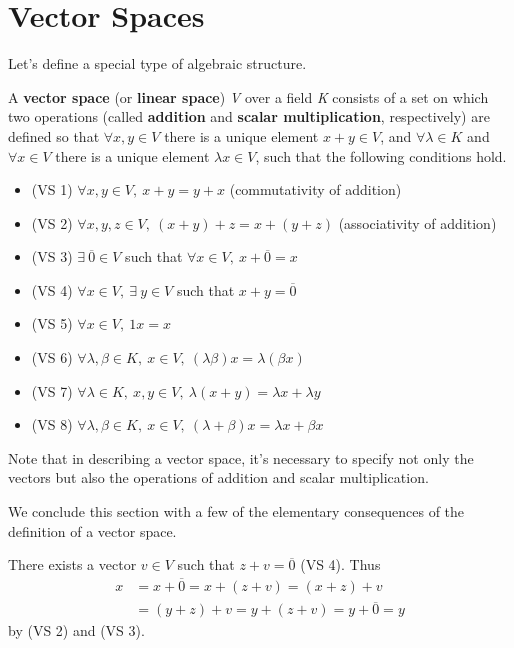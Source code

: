 \section{Vector Spaces}

Let's define a special type of algebraic structure.
\dfn{} {
  A \textbf{vector space} (or \textbf{linear space}) \textit V over a field \textit K consists of a set on which two operations (called \textbf{addition} and \textbf{scalar multiplication}, respectively) are defined so that $\forall x,y \in V$ there is a unique element $x + y \in V$, and $\forall \lambda \in K$ and $\forall x \in V$ there is a unique element $\lambda x \in V$, such that the following conditions hold.
  \begin{itemize}
    \item (VS 1) $\forall x,y \in V,~ x + y = y + x$ (commutativity of addition)
    \item (VS 2) $\forall x,y, z \in V,~ (x + y) + z = x +(y + z)$ (associativity of addition)
    \item (VS 3) $\exists~ \overline 0 \in V$  such that $\forall x \in V,~ x + \overline 0 = x$
    \item (VS 4) $\forall x \in V,~ \exists~ y \in V$ such that $x + y = \overline 0$
    \item (VS 5) $\forall x \in V,~ 1x = x$
    \item (VS 6) $\forall \lambda, \beta \in K,~ x \in V, ~ (\lambda \beta) x = \lambda (\beta x)$
    \item (VS 7) $\forall \lambda \in K,~ x,y \in V,~ \lambda (x + y) = \lambda x + \lambda y$
    \item (VS 8) $\forall \lambda, \beta \in K,~ x \in V,~ (\lambda + \beta)x = \lambda x + \beta x$
  \end{itemize}
}


\noindent Note that in describing a vector space, it's necessary to specify not only the vectors but also the operations of addition and scalar multiplication.

We conclude this section with a few of the elementary consequences of the definition of a vector space.

\begin{myproof}
  There exists a vector $v \in V$ such that $z + v = \overline 0$ (VS 4). Thus
  \begin{align*}
    x &= x + \overline 0 = x + (z + v) = (x + z) + v\\
      &= (y + z) + v = y + (z + v) = y + \overline 0 = y
  \end{align*}
  by (VS 2) and (VS 3).
\end{myproof}

